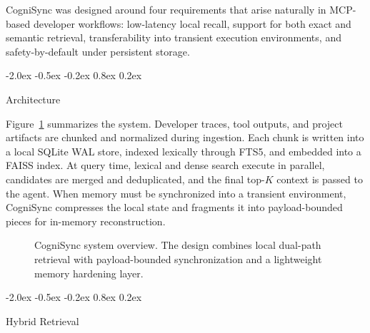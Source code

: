 \documentclass{article}
\makeatletter
\renewcommand{\subsection}{%
  \@startsection{subsection}{2}{\z@}%
                {-2.0ex \@plus -0.5ex \@minus -0.2ex}%
                { 0.8ex \@plus  0.2ex}%
                {\normalsize\bf\raggedright}%
}
\makeatother
\begin{document}
CogniSync was designed around four requirements that arise naturally in MCP-based developer workflows: low-latency local recall, support for both exact and semantic retrieval, transferability into transient execution environments, and safety-by-default under persistent storage.

\subsection{Architecture}

Figure~\ref{fig:architecture} summarizes the system. Developer traces, tool outputs, and project artifacts are chunked and normalized during ingestion. Each chunk is written into a local SQLite WAL store, indexed lexically through FTS5, and embedded into a FAISS index. At query time, lexical and dense search execute in parallel, candidates are merged and deduplicated, and the final top-$K$ context is passed to the agent. When memory must be synchronized into a transient environment, CogniSync compresses the local state and fragments it into payload-bounded pieces for in-memory reconstruction.

\begin{figure}[t]
\centering
{}
\caption{CogniSync system overview. The design combines local dual-path retrieval with payload-bounded synchronization and a lightweight memory hardening layer.}
\label{fig:architecture}
\end{figure}

\subsection{Hybrid Retrieval}
\end{document}
